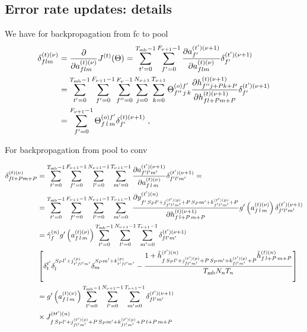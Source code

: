 \begin{subappendices}
\section{Error rate updates: details} \label{sec:appenderrorrate}

We have for backpropagation from fc to pool
\begin{align}
\delta^{(t)(\nu)}_{flm}&= \frac{\partial }{\partial  a_{flm}^{(t)(\nu)}}J^{(t)}(\Theta)=
%
\sum_{t'=0}^{T_{{\rm mb}}-1}\sum_{f'=0}^{F_{\nu+1}-1}
%
 \frac{\partial  a_{f'}^{(t')(\nu+1)}}{\partial  a_{flm}^{(t)(\nu)}} \delta^{(t')(\nu+1)}_{f'}\notag\\
%
&=\sum_{t'=0}^{T_{{\rm mb}}-1}\sum_{f'=0}^{F_{\nu+1}-1}\sum^{F_\nu-1}_{f''=0}
%
\sum^{N_{\nu+1}}_{j=0}\sum^{T_{\nu+1}}_{k=0}\Theta^{(o)f'}_{f''\,j\,k}
%
\frac{\partial h^{(t)(\nu+1)}_{f''j+Pk+P} }{\partial  h_{fl+Pm+P}^{(t)(\nu+1)}} \delta^{(t')(\nu+1)}_{f'}\notag\\
%
&=\sum_{f'=0}^{F_{\nu+1}-1}\Theta^{(o)f'}_{f\,l\,m} \delta^{(t)(\nu+1)}_{f'}\;,
\end{align}

For backpropagation from pool to conv

\begin{align}
\delta^{(t)(\nu)}_{fl+Pm+P}&=
%
\sum_{t'=0}^{T_{{\rm mb}}-1}\sum^{F_{\nu+1}-1}_{f'=0}\sum^{N_{\nu+1}-1}_{l'=0}\sum^{T_{\nu+1}-1}_{m'=0}
%
\frac{\partial a_{f'l'm'}^{(t')(\nu+1)}}{\partial a_{f\,l\,m}^{(t)(\nu)}}
%
\delta_{f'l'm'}^{(t')(\nu+1)}
%
=\notag\\
%
&=\sum_{t'=0}^{T_{{\rm mb}}-1}\sum^{F_{\nu+1}-1}_{f'=0}\sum^{N_{\nu+1}-1}_{l'=0}\sum^{T_{\nu+1}-1}_{m'=0}
%
\frac{\partial y_{f'\,S_P l'+j_{f'l'm'}^{(t')(p)}+P\,S_Pm'+k_{f'l'm'}^{(t')(p)}+P}^{(t')(n)}}{\partial h_{f\,l+P\,m+P}^{(t)(\nu+1)}}
%
g'\left(a_{f\,l\,m}^{(t)(\nu)}\right)\delta_{f'l'm'}^{(t')(\nu+1)}\notag\\
%
&=\tilde{\gamma}^{(n)}_fg'\left(a_{f\,l\,m}^{(t)(\nu)}\right)
%
\sum_{t'=0}^{T_{{\rm mb}}-1}\sum^{N_{\nu+1}-1}_{l'=0}\sum^{T_{\nu+1}-1}_{m'=0}\delta_{fl'm'}^{(t')(\nu+1)}\notag\\
%
&\left[\delta^{t'}_t\delta^{S_P l'+j_{t'fl'm'}^{(p)}}_l\delta^{S_Pm'+k_{t'fl'm'}^{(p)}}_m-
%
\frac{1+\tilde{h}_{f\,S_P l'+j_{fl'm'}^{(t')(p)}+P\,S_Pm'+k_{fl'm'}^{(t')(p)}+P}^{(t')(n)}\tilde{h}_{f\,l+P\,m+P}^{(t)(n)}}{T_{{\rm mb}}N_{n}T_{n}}\right]\notag\\
%
&=g'\left(a_{f\,l\,m}^{(t)(\nu)}\right)\sum_{t'=0}^{T_{{\rm mb}}-1}\sum^{N_{\nu+1}-1}_{l'=0}
%
\sum^{T_{\nu+1}-1}_{m'=0}\delta_{fl'm'}^{(t')(\nu+1)}\notag\\
%
&\times J^{(tt')(n)}_{f\,S_P l'+j_{fl'm'}^{(t')(p)}+P\,S_Pm'+k_{fl'm'}^{(t')(p)}+P\,l+P\,m+P}
\end{align}


\end{subappendices}
